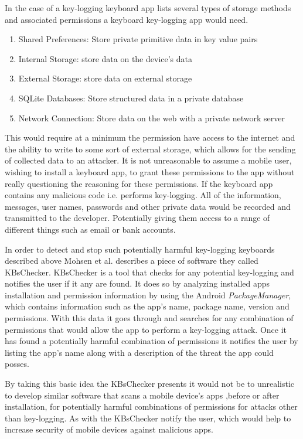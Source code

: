 \documentclass{sig-alternate}
\begin{document}
	  In the case of a key-logging keyboard app \cite{Keylogging} lists several types of storage methods and associated permissions a keyboard key-logging app would need.
	\begin{enumerate}
	\item Shared Preferences: Store private primitive data in key value pairs
	\item Internal Storage: store data on the device's data
	\item External Storage: store data on external storage
	\item SQLite Databases: Store structured data in a private database
	\item Network Connection: Store data on the web with a private network server
	\end{enumerate} 
	 
This would require at a minimum the permission have access to the internet and the ability to write to some sort of external storage, which allows for the sending of collected data to an attacker. It is not unreasonable to assume a mobile user, wishing to install a keyboard app, to grant these permissions to the app without really questioning the reasoning for these permissions. If the keyboard app contains any malicious code i.e. performs key-logging. All of the information, messages, user names, passwords and other private data would be recorded and transmitted to the developer. Potentially giving them access to a range of different things such as email or bank accounts.

In order to detect and stop such potentially harmful key-logging keyboards described above Mohsen et al. \cite{Keylogging} describes a piece of software they called KBsChecker. KBsChecker is a tool that checks for any potential key-logging and notifies the user if it any are found. It does so by analyzing installed apps installation and permission information by using the Android \textit{PackageManager}, which contains information such as the app's name, package name, version and permissions. With this data it goes through and searches for any combination of permissions that would allow the app to perform a key-logging attack. Once it has found a potentially harmful combination of permissions it notifies the user by listing the app's name along with a description of the threat the app could posses.

 By taking this basic idea the KBsChecker presents it would not be to unrealistic to develop similar software that scans a mobile device's apps ,before or after installation, for potentially harmful combinations of permissions for attacks other than key-logging. As with the KBsChecker notify the user, which would help to increase security of mobile devices against malicious apps.    
\end{document}
